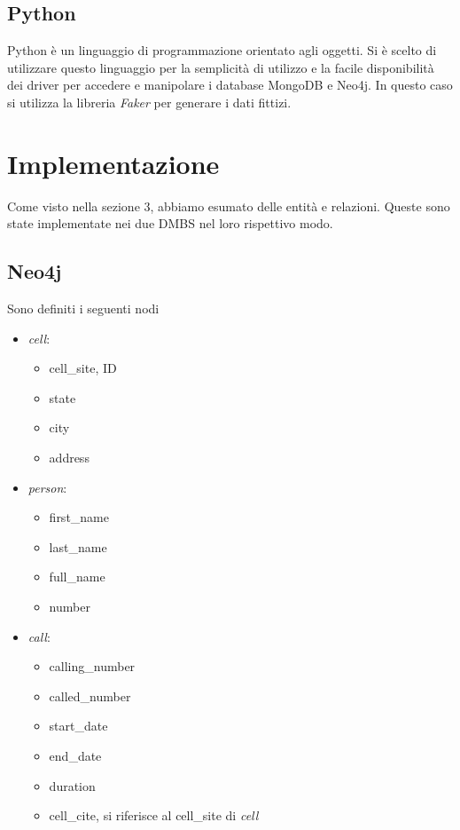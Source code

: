     \subsection{Python}
    Python è un linguaggio di programmazione orientato agli oggetti. Si è scelto di utilizzare questo
    linguaggio per la semplicità di utilizzo e la facile disponibilità dei driver per accedere e manipolare
    i database MongoDB e Neo4j. In questo caso si utilizza la libreria \textit{Faker} per generare i dati fittizi.

\section{Implementazione}
    Come visto nella sezione 3, abbiamo esumato delle entità e relazioni. Queste sono state implementate
    nei due DMBS nel loro rispettivo modo.

    \subsection{Neo4j}

    Sono definiti i seguenti nodi
    \begin{itemize}
        \item \textit{cell}:
            \begin{itemize}
                \item cell\_site, ID
                \item state
                \item city
                \item address
            \end{itemize}

        \item \textit{person}:
            \begin{itemize}
                \item first\_name
                \item last\_name
                \item full\_name
                \item number
            \end{itemize}

        \item \textit{call}:
            \begin{itemize}
                \item calling\_number
                \item called\_number
                \item start\_date
                \item end\_date
                \item duration
                \item cell\_cite, si riferisce al cell\_site di \textit{cell}
            \end{itemize}
    \end{itemize}


